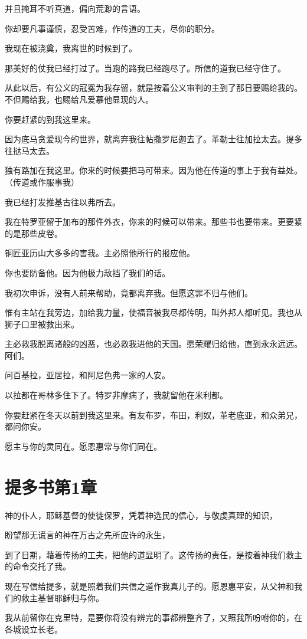 \documentclass[12pt,oneside]{book}
\begin{document}
并且掩耳不听真道，偏向荒渺的言语。

你却要凡事谨慎，忍受苦难，作传道的工夫，尽你的职分。

我现在被浇奠，我离世的时候到了。

那美好的仗我已经打过了。当跑的路我已经跑尽了。所信的道我已经守住了。

从此以后，有公义的冠冕为我存留，就是按着公义审判的主到了那日要赐给我的。不但赐给我，也赐给凡爱慕他显现的人。

你要赶紧的到我这里来。

因为底马贪爱现今的世界，就离弃我往帖撒罗尼迦去了。革勒士往加拉太去。提多往挞马太去。

独有路加在我这里。你来的时候要把马可带来。因为他在传道的事上于我有益处。（传道或作服事我）

我已经打发推基古往以弗所去。

我在特罗亚留于加布的那件外衣，你来的时候可以带来。那些书也要带来。更要紧的是那些皮卷。

铜匠亚历山大多多的害我。主必照他所行的报应他。

你也要防备他。因为他极力敌挡了我们的话。

我初次申诉，没有人前来帮助，竟都离弃我。但愿这罪不归与他们。

惟有主站在我旁边，加给我力量，使福音被我尽都传明，叫外邦人都听见。我也从狮子口里被救出来。

主必救我脱离诸般的凶恶，也必救我进他的天国。愿荣耀归给他，直到永永远远。阿们。

问百基拉，亚居拉，和阿尼色弗一家的人安。

以拉都在哥林多住下了。特罗非摩病了，我就留他在米利都。

你要赶紧在冬天以前到我这里来。有友布罗，布田，利奴，革老底亚，和众弟兄，都问你安。

愿主与你的灵同在。愿恩惠常与你们同在。

\chapter{提多书第1章}
神的仆人，耶稣基督的使徒保罗，凭着神选民的信心，与敬虔真理的知识，

盼望那无谎言的神在万古之先所应许的永生，

到了日期，藉着传扬的工夫，把他的道显明了。这传扬的责任，是按着神我们救主的命令交托了我。

现在写信给提多，就是照着我们共信之道作我真儿子的。愿恩惠平安，从父神和我们的救主基督耶稣归与你。

我从前留你在克里特，是要你将没有辨完的事都辨整齐了，又照我所吩咐你的，在各城设立长老。
\end{document}
